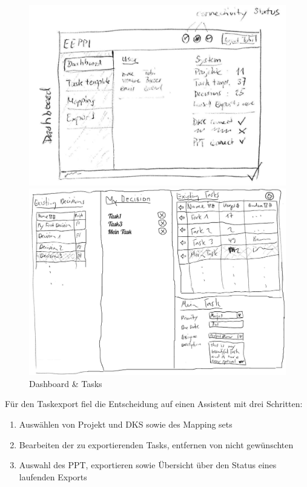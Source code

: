 		\begin{figure}[H]
			\begin{minipage}[b]{0.5\linewidth}
				\includegraphics[width=\linewidth]{interfacesAndProtocols/media/img/dashboard.jpg}
			\end{minipage}
			\begin{minipage}[b]{0.5\linewidth}	
				\includegraphics[width=\linewidth]{interfacesAndProtocols/media/img/tasks.jpg}
			\end{minipage}
			\caption{Dashboard \& Tasks}
			\label{fig:dashboardAndTasks}
		\end{figure}
		
		Für den Taskexport fiel die Entscheidung auf einen Assistent mit drei Schritten:
		\begin{enumerate}
			\item Auswählen von Projekt und DKS sowie des Mapping sets
			\item Bearbeiten der zu exportierenden Tasks, entfernen von nicht gewünschten
			\item Auswahl des PPT, exportieren sowie Übersicht über den Status eines laufenden Exports
		\end{enumerate}
		
